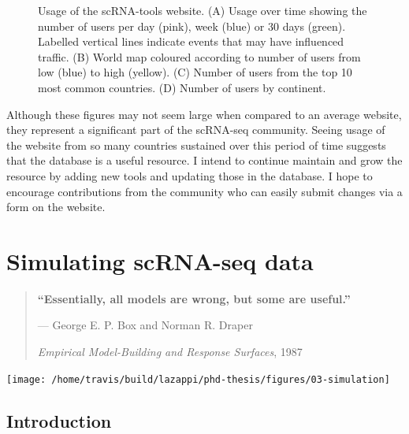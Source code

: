 \documentclass[11pt,a4paper,titlepage,twoside,openright]{style/unimelbthesis}
\theoremstyle{definition}
\theoremstyle{definition}
\theoremstyle{definition}
\theoremstyle{remark}
\begin{document}
\begin{mainmatter}
\begin{figure}
{}

\caption[Usage of the scRNA-tools website.]{Usage of the scRNA-tools website. (A) Usage over time showing the number of users per day (pink), week (blue) or 30 days (green). Labelled vertical lines indicate events that may have influenced traffic. (B) World map coloured according to number of users from low (blue) to high (yellow). (C) Number of users from the top 10 most common countries. (D) Number of users by continent.}\label{fig:tools-analytics-plot}
\end{figure}





Although these figures may not seem large when compared to an average website, they represent a significant part of the scRNA-seq community. Seeing usage of the website from so many countries sustained over this period of time suggests that the database is a useful resource. I intend to continue maintain and grow the resource by adding new tools and updating those in the database. I hope to encourage contributions from the community who can easily submit changes via a form on the website.

\hypertarget{simulation}{%
\chapter{Simulating scRNA-seq data}\label{simulation}}

\begin{quote}
\textbf{\enquote{Essentially, all models are wrong, but some are useful.}}

--- George E. P. Box and Norman R. Draper

\emph{Empirical Model-Building and Response Surfaces}, 1987
\end{quote}

\begin{center}\texttt{[image: /home/travis/build/lazappi/phd-thesis/figures/03-simulation]} \end{center}

\clearpage

\hypertarget{introduction-2}{%
\section{Introduction}\label{introduction-2}}


\end{mainmatter}
\end{document}
